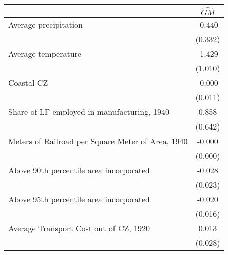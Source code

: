  \begin{tabular}{l*{1}{c}} \toprule
                &\multicolumn{1}{c}{$\widehat{GM}$}\\
\midrule
Average precipitation&   -0.440   \\
                &  (0.332)   \\
\addlinespace
Average temperature&   -1.429   \\
                &  (1.010)   \\
\addlinespace
Coastal CZ      &   -0.000   \\
                &  (0.011)   \\
\addlinespace
Share of LF employed in manufacturing, 1940&    0.858   \\
                &  (0.642)   \\
\addlinespace
Meters of Railroad per Square Meter of Area, 1940&   -0.000   \\
                &  (0.000)   \\
\addlinespace
Above 90th percentile area incorporated&   -0.028   \\
                &  (0.023)   \\
\addlinespace
Above 95th percentile area incorporated&   -0.020   \\
                &  (0.016)   \\
\addlinespace
Average Transport Cost out of CZ, 1920&    0.013   \\
                &  (0.028)   \\
 \bottomrule \end{tabular}
